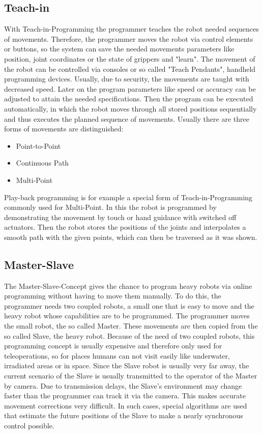 \documentclass[conference]{IEEEtran}
\begin{document}
    \subsection{Teach-in}
        With Teach-in-Programming the programmer teaches the robot needed sequences of movements. Therefore, the programmer moves the robot via control elements or buttons, so the system can save the needed movements parameters like position, joint coordinates or the state of grippers and "learn". The movement of the robot can be controlled via consoles or so called "Teach Pendants", handheld programming devices. Usually, due to security, the movements are taught with decreased speed. Later on the program parameters like speed or accuracy can be adjusted to attain the needed specifications. Then the program can be executed automatically, in which the robot moves through all stored positions sequentially and thus executes the planned sequence of movements. \cite[pp. 187 - 188]{b4} %
        Usually there are three forms of movements are distinguished:
        \begin{itemize}
            \item Point-to-Point
            \item Continuous Path
            \item Multi-Point
        \end{itemize}

        Play-back programming is for example a special form of Teach-in-Programming commonly used for Multi-Point. In this the robot is programmed by demonstrating the movement by touch or hand guidance with switched off actuators. Then the robot stores the positions of the joints and interpolates a smooth path with the given points, which can then be traversed as it was shown. \cite[pp. 188 - 189]{b4}%

    \subsection{Master-Slave}
        The Master-Slave-Concept gives the chance to program heavy robots via online programming without having to move them manually. To do this, the programmer needs two coupled robots, a small one that is easy to move and the heavy robot whose capabilities are to be programmed. The programmer moves the small robot, the so called Master. These movements are then copied from the so called Slave, the heavy robot. Because of the need of two coupled robots, this programming concept is usually expensive and therefore only used for teleoperations, so for places humans can not visit easily like underwater, irradiated areas or in space. Since the Slave robot is usually very far away, the current scenario of the Slave is usually transmitted to the operator of the Master by camera. Due to transmission delays, the Slave's environment may change faster than the programmer can track it via the camera. This makes accurate movement corrections very difficult. In such cases, special algorithms are used that estimate the future positions of the Slave to make a nearly synchronous control possible. \cite[p. 91]{b6}%
\end{document}
